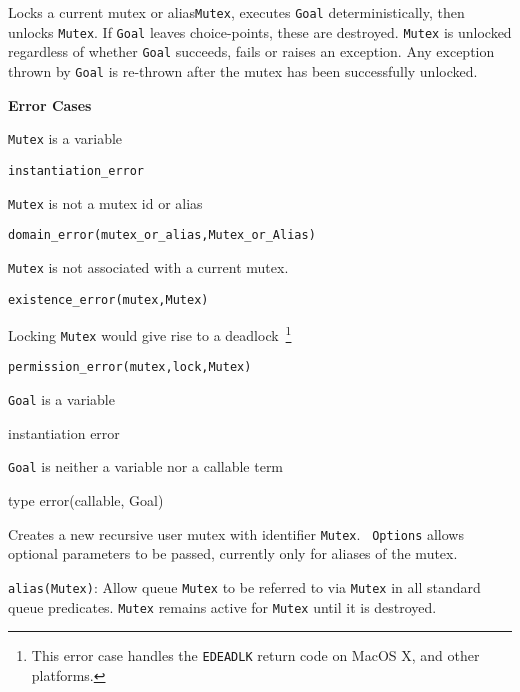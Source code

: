 \begin{description}
%
Locks a current mutex or alias{\tt Mutex}, executes {\tt Goal}
deterministically, then unlocks {\tt Mutex}.  If {\tt Goal} leaves
choice-points, these are destroyed.  {\tt Mutex} is unlocked
regardless of whether {\tt Goal} succeeds, fails or raises an
exception. Any exception thrown by {\tt Goal} is re-thrown after the
mutex has been successfully unlocked.

{\bf Error Cases}
\bi
\item 	{\tt Mutex} is a variable
\bi
\item 	{\tt instantiation\_error}
\ei
%
\item 	{\tt Mutex} is not a mutex id or alias
\bi
\item 	{\tt domain\_error(mutex\_or\_alias,Mutex\_or\_Alias)}
\ei
%
\item 	{\tt Mutex} is not associated with a current mutex.
\bi
\item 	{\tt existence\_error(mutex,Mutex)}
\ei
\item Locking {\tt Mutex} would give rise to a deadlock~\footnote{This
  error case handles the {\tt EDEADLK} return code on MacOS X, and other
  platforms.}
\bi
\item 	{\tt permission\_error(mutex,lock,Mutex)}
\ei
\item {\tt Goal} is a variable
\bi
\item  instantiation error
\ei
%
\item {\tt Goal} is neither a variable nor a callable term
\bi
\item type error(callable, Goal)
\ei
%
\ei

%
Creates a new recursive user mutex with identifier {\tt Mutex}.  {\tt
  Options} allows optional parameters to be passed, currently only for
aliases of the mutex.
%
\bi
\item {\tt alias(Mutex)}: Allow queue {\tt Mutex} to be referred to
  via {\tt Mutex} in all standard queue predicates.  {\tt Mutex}
  remains active for {\tt Mutex} until it is destroyed.
\ei


\end{description}
